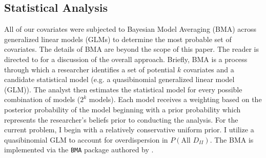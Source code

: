 \documentclass[1p, review]{elsarticle}\usepackage[]{graphicx}\usepackage[]{color}
\begin{document}
\begin{table}[ht]
\centering
{}
\caption{Descriptive Statistics} 
\label{tabdesc}
\end{table}


\subsection{Statistical Analysis}
All of our covariates were subjected to Bayesian Model Averaging (BMA) across generalized linear models (GLMs) to determine the most probable set of covariates. The details of BMA are beyond the scope of this paper. The reader is directed to \citet{Hoeting1999} for a discussion of the overall approach. Briefly, BMA is a process through which a researcher identifies a set of potential $k$ covariates and a candidate statistical model (e.g. a quasibinomial generalized linear model (GLM)). The analyst then estimates the statistical model for every possible combination of models ($2^k$ models). Each model receives a weighting based on the posterior probability of the model beginning with a prior probability which represents the researcher's beliefs prior to conducting the analysis. For the current problem, I begin with a relatively conservative uniform prior. I utilize a quasibinomial GLM to account for overdispersion in $P(\text{All }D_{II})$. The BMA is implemented via the \texttt{BMA} package authored by \citet{Raftery2009}. 
\end{document}
